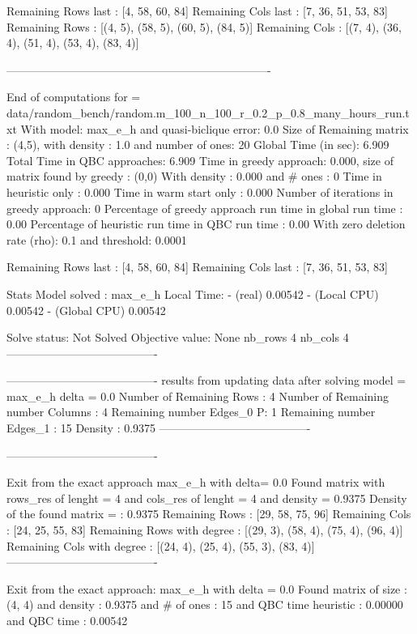  Remaining Rows last : [4, 58, 60, 84]
 Remaining  Cols  last : [7, 36, 51, 53, 83]
  Remaining Rows  : [(4, 5), (58, 5), (60, 5), (84, 5)]
 Remaining  Cols  : [(7, 4), (36, 4), (51, 4), (53, 4), (83, 4)]

----------------------------------------------------------------------
 
    End of computations for = data/random_bench/random.m_100_n_100_r_0.2_p_0.8_many_hours_run.txt 
    With  model: max_e_h and quasi-biclique error: 0.0
    Size of Remaining matrix : (4,5), with  density : 1.0 and number of ones: 20
    Global Time (in sec): 6.909
    Total Time in QBC approaches: 6.909
    Time in greedy approach: 0.000,  size of matrix found by greedy : (0,0) 
    With density : 0.000 and # ones : 0 
    Time in heuristic only : 0.000 
    Time in warm start only : 0.000
    Number of iterations in greedy approach: 0
    Percentage of greedy approach run time in global run time : 0.00%
    Percentage of heuristic run time in QBC run time : 0.00%
    With zero deletion rate (rho): 0.1 and threshold: 0.0001
    
 Remaining Rows last : [4, 58, 60, 84]
 Remaining  Cols  last : [7, 36, 51, 53, 83]
 
 Stats
 Model solved : max_e_h  Local Time:  - (real) 0.00542 - (Local CPU) 0.00542 - (Global CPU) 0.00542

 Solve status: Not Solved Objective value: None nb_rows 4 nb_cols 4
----------------------------------------

----------------------------------------
 results from updating data after solving model = max_e_h  delta =   0.0
Number of Remaining  Rows  : 4
Number of Remaining number Columns : 4
Remaining  number Edges_0 P: 1 Remaining  number Edges_1 : 15 Density : 0.9375
----------------------------------------

----------------------------------------

Exit from the exact  approach  max_e_h  with delta= 0.0 Found matrix with rows_res of lenght = 4  and cols_res of lenght = 4 and density = 0.9375
 Density of the found matrix =  : 0.9375
 Remaining Rows  : [29, 58, 75, 96]
 Remaining  Cols  : [24, 25, 55, 83]
 Remaining Rows with degree : [(29, 3), (58, 4), (75, 4), (96, 4)]
 Remaining  Cols with degree : [(24, 4), (25, 4), (55, 3), (83, 4)]
----------------------------------------

        Exit from the exact approach: max_e_h
        with delta =  0.0
        Found matrix of size : (4, 4)
        and density : 0.9375
        and # of ones : 15
        and QBC time heuristic  : 0.00000
        and QBC time  : 0.00542
        

